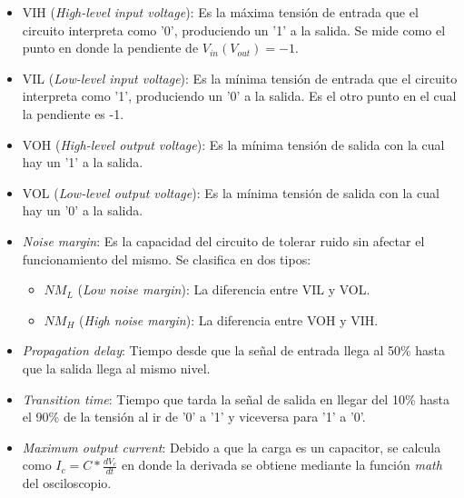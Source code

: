 \begin{itemize}
    \item VIH (\textit{High-level input voltage}): Es la m\'axima tensi\'on de entrada que el circuito interpreta como '0', produciendo un '1' a la salida. Se mide como el punto en donde la pendiente de $V_{in}(V_{out}) = -1$.
    \item VIL (\textit{Low-level input voltage}): Es la m\'inima tensi\'on de entrada que el circuito interpreta como '1', produciendo un '0' a la salida. Es el otro punto en el cual la pendiente es -1.
    \item VOH (\textit{High-level output voltage}): Es la m\'inima tensi\'on de salida con la cual hay un '1' a la salida.
    \item VOL (\textit{Low-level output voltage}): Es la m\'inima tensi\'on de salida con la cual hay un '0' a la salida.
    \item \textit{Noise margin}: Es la capacidad del circuito de tolerar ruido sin afectar el funcionamiento del mismo. Se clasifica en dos tipos:
    \begin{itemize}
        \item $NM_L$ (\textit{Low noise margin}): La diferencia entre VIL y VOL.
        \item $NM_H$ (\textit{High noise margin}): La diferencia entre VOH y VIH.
    \end{itemize}
    \item \textit{Propagation delay}: Tiempo desde que la se\~nal de entrada llega al 50\% hasta que la salida llega al mismo nivel.
    \item \textit{Transition time}: Tiempo que tarda la se\~nal de salida en llegar del 10\% hasta el 90\% de la tensi\'on al ir de '0' a '1' y viceversa para '1' a '0'.
    \item \textit{Maximum output current}: Debido a que la carga es un capacitor, se calcula como $I_c = C * \frac{dV_c}{dt}$ en donde la derivada se obtiene mediante la funci\'on \textit{math} del osciloscopio.
\end{itemize}

